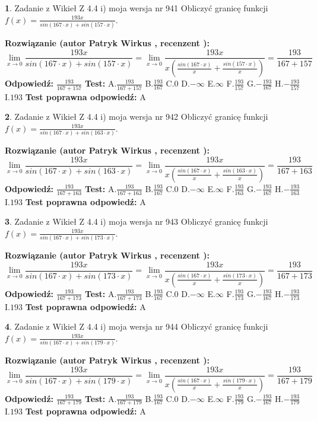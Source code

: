 \documentclass[12pt, a4paper]{article}
\theoremstyle{definition} %
\newtheorem{zad}{}
\newcommand{\zadStart}[1]{\begin{zad}#1\newline}
\newcommand{\zadStop}{\end{zad}}
\newcommand{\rozwStart}[2]{\noindent \textbf{Rozwiązanie (autor #1 , recenzent #2): }\newline}
\newcommand{\rozwStop}{\newline}
\newcommand{\odpStart}{\noindent \textbf{Odpowiedź:}\newline}
\newcommand{\odpStop}{\newline}
\newcommand{\testStart}{\noindent \textbf{Test:}\newline}
\newcommand{\testStop}{\newline}
\newcommand{\kluczStart}{\noindent \textbf{Test poprawna odpowiedź:}\newline}
\newcommand{\kluczStop}{\newline}
\begin{document}
\zadStart{Zadanie z Wikieł Z 4.4 i) moja wersja nr 941}
Obliczyć granicę funkcji $f(x)=\frac{193x}{sin(167\cdot x) +sin(157\cdot x)}$.
\zadStop
\rozwStart{Patryk Wirkus}{}
$$\lim\limits_{x\to 0}\frac{193x}{sin(167\cdot x) +sin(157\cdot x)}=\lim\limits_{x\to 0}\frac{193x}{x(\frac{sin(167\cdot x)}{x}+\frac{sin(157\cdot x)}{x})}=\frac{193}{167+157}$$
\rozwStop
\odpStart
$\frac{193}{167+157}$
\odpStop
\testStart
A.$\frac{193}{167+157}$
B.$\frac{193}{167}$
C.$0$
D.$-\infty$
E.$\infty$
F.$\frac{193}{157}$
G.$-\frac{193}{167}$
H.$-\frac{193}{157}$
I.$193$
\testStop
\kluczStart
A
\kluczStop



\zadStart{Zadanie z Wikieł Z 4.4 i) moja wersja nr 942}
Obliczyć granicę funkcji $f(x)=\frac{193x}{sin(167\cdot x) +sin(163\cdot x)}$.
\zadStop
\rozwStart{Patryk Wirkus}{}
$$\lim\limits_{x\to 0}\frac{193x}{sin(167\cdot x) +sin(163\cdot x)}=\lim\limits_{x\to 0}\frac{193x}{x(\frac{sin(167\cdot x)}{x}+\frac{sin(163\cdot x)}{x})}=\frac{193}{167+163}$$
\rozwStop
\odpStart
$\frac{193}{167+163}$
\odpStop
\testStart
A.$\frac{193}{167+163}$
B.$\frac{193}{167}$
C.$0$
D.$-\infty$
E.$\infty$
F.$\frac{193}{163}$
G.$-\frac{193}{167}$
H.$-\frac{193}{163}$
I.$193$
\testStop
\kluczStart
A
\kluczStop



\zadStart{Zadanie z Wikieł Z 4.4 i) moja wersja nr 943}
Obliczyć granicę funkcji $f(x)=\frac{193x}{sin(167\cdot x) +sin(173\cdot x)}$.
\zadStop
\rozwStart{Patryk Wirkus}{}
$$\lim\limits_{x\to 0}\frac{193x}{sin(167\cdot x) +sin(173\cdot x)}=\lim\limits_{x\to 0}\frac{193x}{x(\frac{sin(167\cdot x)}{x}+\frac{sin(173\cdot x)}{x})}=\frac{193}{167+173}$$
\rozwStop
\odpStart
$\frac{193}{167+173}$
\odpStop
\testStart
A.$\frac{193}{167+173}$
B.$\frac{193}{167}$
C.$0$
D.$-\infty$
E.$\infty$
F.$\frac{193}{173}$
G.$-\frac{193}{167}$
H.$-\frac{193}{173}$
I.$193$
\testStop
\kluczStart
A
\kluczStop



\zadStart{Zadanie z Wikieł Z 4.4 i) moja wersja nr 944}
Obliczyć granicę funkcji $f(x)=\frac{193x}{sin(167\cdot x) +sin(179\cdot x)}$.
\zadStop
\rozwStart{Patryk Wirkus}{}
$$\lim\limits_{x\to 0}\frac{193x}{sin(167\cdot x) +sin(179\cdot x)}=\lim\limits_{x\to 0}\frac{193x}{x(\frac{sin(167\cdot x)}{x}+\frac{sin(179\cdot x)}{x})}=\frac{193}{167+179}$$
\rozwStop
\odpStart
$\frac{193}{167+179}$
\odpStop
\testStart
A.$\frac{193}{167+179}$
B.$\frac{193}{167}$
C.$0$
D.$-\infty$
E.$\infty$
F.$\frac{193}{179}$
G.$-\frac{193}{167}$
H.$-\frac{193}{179}$
I.$193$
\testStop
\kluczStart
A
\kluczStop
\end{document}
